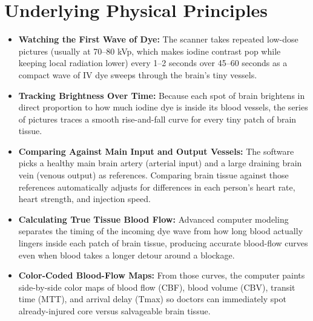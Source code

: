 \section{Underlying Physical Principles}
\begin{itemize}
    \item \textbf{Watching the First Wave of Dye:} The scanner takes repeated low-dose pictures (usually at 70--80 kVp, which makes iodine contrast pop while keeping local radiation lower) every 1--2 seconds over 45--60 seconds as a compact wave of IV dye sweeps through the brain's tiny vessels.
    \item \textbf{Tracking Brightness Over Time:} Because each spot of brain brightens in direct proportion to how much iodine dye is inside its blood vessels, the series of pictures traces a smooth rise-and-fall curve for every tiny patch of brain tissue.
    \item \textbf{Comparing Against Main Input and Output Vessels:} The software picks a healthy main brain artery (arterial input) and a large draining brain vein (venous output) as references. Comparing brain tissue against those references automatically adjusts for differences in each person's heart rate, heart strength, and injection speed.
    \item \textbf{Calculating True Tissue Blood Flow:} Advanced computer modeling separates the timing of the incoming dye wave from how long blood actually lingers inside each patch of brain tissue, producing accurate blood-flow curves even when blood takes a longer detour around a blockage.
    \item \textbf{Color-Coded Blood-Flow Maps:} From those curves, the computer paints side-by-side color maps of blood flow (CBF), blood volume (CBV), transit time (MTT), and arrival delay (Tmax) so doctors can immediately spot already-injured core versus salvageable brain tissue.
\end{itemize}

